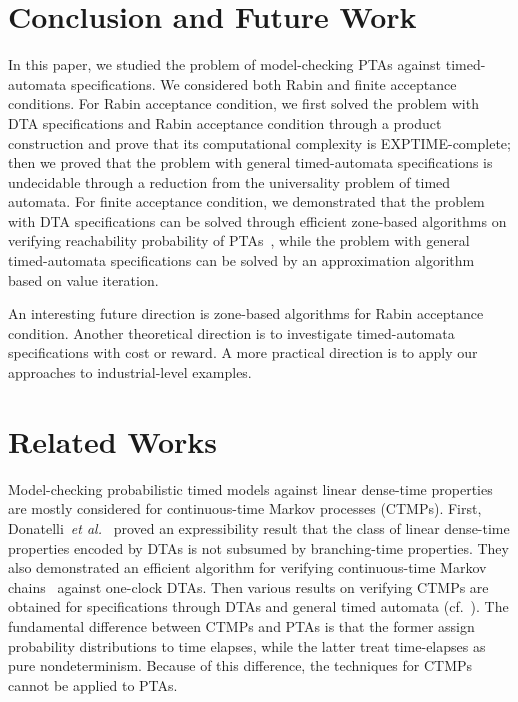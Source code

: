 \section{Conclusion and Future Work}

In this paper, we studied the problem of model-checking PTAs against timed-automata specifications.
We considered both Rabin and finite acceptance conditions.
For Rabin acceptance condition,  
we first solved the problem with DTA specifications and Rabin acceptance condition through a product construction and prove that its computational
complexity is EXPTIME-complete;
then we proved that the problem with general timed-automata specifications is undecidable through a reduction from the universality problem of timed automata. 
For finite acceptance condition, we demonstrated that the problem with DTA specifications can be solved through efficient zone-based algorithms on verifying reachability probability of PTAs~\cite{DBLP:journals/fmsd/NormanPS13,DBLP:journals/tcs/KwiatkowskaNSS02}, while the problem with general timed-automata specifications can be solved by an approximation algorithm based on value iteration.

An interesting future direction is zone-based algorithms for Rabin acceptance condition.  
Another theoretical direction is to investigate timed-automata specifications with cost or reward.
A more practical direction is to apply our approaches to industrial-level examples. 

\section{Related Works}

Model-checking probabilistic timed models against linear dense-time properties
are mostly considered for continuous-time Markov processes (CTMPs).
First, Donatelli~\emph{et al.}~\cite{DBLP:journals/tse/DonatelliHS09} proved an expressibility result that the class of linear dense-time properties encoded by DTAs is not subsumed by branching-time properties.
They also demonstrated an efficient algorithm for verifying continuous-time Markov chains~\cite{?} against one-clock DTAs.
Then various results on verifying CTMPs are obtained for specifications through DTAs and general timed automata (cf.~\cite{DBLP:journals/tse/DonatelliHS09,DBLP:journals/corr/abs-1101-3694,DBLP:conf/hybrid/Fu13,DBLP:conf/hybrid/BrazdilKKKR11,DBLP:conf/tacas/BarbotCHKM11,DBLP:conf/formats/BortolussiL15}).
The fundamental difference between CTMPs and PTAs is that the former assign probability distributions to time elapses, while the latter treat time-elapses as pure nondeterminism.
Because of this difference, the techniques for CTMPs cannot be applied to PTAs.

